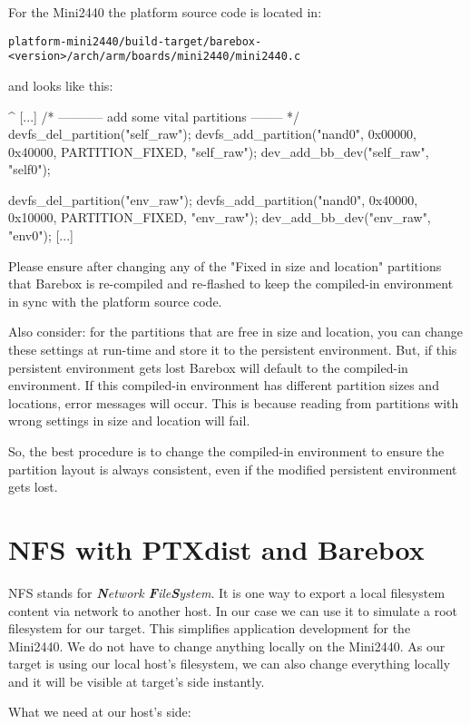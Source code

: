 For the Mini2440 the platform source code is located in:

\texttt{platform-mini2440/build-target/barebox-<version>/arch/arm/boards/mini2440/mini2440.c}

and looks like this:

\begin{ptxshell}[escapechar=|]{^}
[...]
      /* ----------- add some vital partitions -------- */
   devfs_del_partition("self_raw");
   devfs_add_partition("nand0", 0x00000, 0x40000, PARTITION_FIXED, "self_raw");
   dev_add_bb_dev("self_raw", "self0");

   devfs_del_partition("env_raw");
   devfs_add_partition("nand0", 0x40000, 0x10000, PARTITION_FIXED, "env_raw");
   dev_add_bb_dev("env_raw", "env0");
[...]
\end{ptxshell}

Please ensure after changing any of the "Fixed in size and location" partitions
that Barebox is re-compiled and re-flashed to keep the compiled-in environment
in sync with the platform source code.

Also consider: for the partitions that are free in size and location, you can
change these settings at run-time and store it to the persistent environment.
But, if this persistent environment gets lost Barebox will default to the
compiled-in environment. If this compiled-in environment has different
partition sizes and locations, error messages will occur. This is because
reading from partitions with wrong settings in size and location will fail.

So, the best procedure is to change the compiled-in environment to ensure the
partition layout is always consistent, even if the modified persistent
environment gets lost.

\section{NFS with PTXdist and Barebox}

NFS stands for \textit{\textbf{N}etwork \textbf{F}ile\textbf{S}ystem}. It is one
way to export a local filesystem content via network to another host. In our case
we can use it to simulate a root filesystem for our target. This simplifies application
development for the Mini2440. We do not have to change anything locally on the
Mini2440. As our target is using our local host's filesystem, we can also change
everything locally and it will be visible at target's side instantly.

What we need at our host's side:

